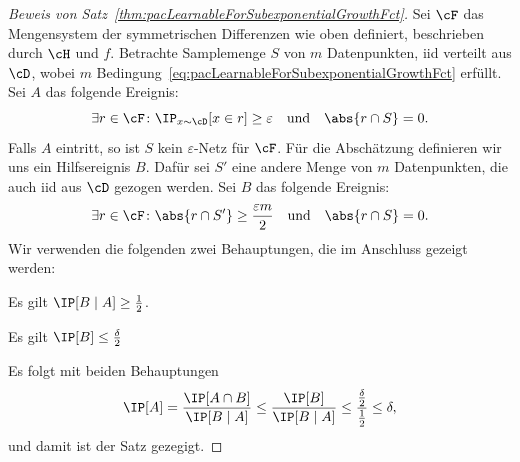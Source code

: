 \documentclass[language=ngerman,algolist,acrolist]{TemplateLecture}
\begin{document}
\begin{proof}[Beweis von Satz~\ref{thm:pacLearnableForSubexponentialGrowthFct}]
    Sei $\cF$ das Mengensystem der symmetrischen Differenzen wie oben definiert, beschrieben durch $\cH$ und $f$. Betrachte Samplemenge $S$ von $m$ Datenpunkten, \ac{iid} verteilt aus $\cD$, wobei $m$ Bedingung~\eqref{eq:pacLearnableForSubexponentialGrowthFct} erfüllt. Sei $A$ das folgende Ereignis:
    \begin{equation*}
        \exists r \in \cF\colon \IP_{x \sim \cD}[x \in r] \geq \varepsilon \quad \text{und} \quad \abs{r \cap S} = 0.
    \end{equation*}
    Falls $A$ eintritt, so ist $S$ kein $\varepsilon$-Netz für $\cF$. Für die Abschätzung definieren wir uns ein Hilfsereignis $B$. Dafür sei $S'$ eine andere Menge von $m$ Datenpunkten, die auch \ac{iid} aus $\cD$ gezogen werden. Sei $B$ das folgende Ereignis:
    \begin{equation*}
        \exists r \in \cF \colon \abs{r \cap S'} \geq \frac{\varepsilon m}{2} \quad \text{und} \quad \abs{r \cap S} = 0.
    \end{equation*}
    Wir verwenden die folgenden zwei Behauptungen, die im Anschluss gezeigt werden:
    \begin{clm}\label{clm:pacLearnableForSubexponentialGrowthFct-1}
        Es gilt $\IP[B \mid A] \geq \frac{1}{2}$. 
    \end{clm}
    \begin{clm}\label{clm:pacLearnableForSubexponentialGrowthFct-2}
        Es gilt $\IP[B] \leq \frac{\delta}{2}$
    \end{clm}
    Es folgt mit beiden Behauptungen 
    \begin{equation*}
        \IP[A] = \frac{\IP[A \cap B]}{\IP[B \mid A]} \leq \frac{\IP[B]}{\IP[B \mid A]} \leq \frac{\frac{\delta}{2}}{\frac{1}{2}} \leq \delta,
    \end{equation*}
    und damit ist der Satz gezegigt.
\end{proof}
\end{document}
